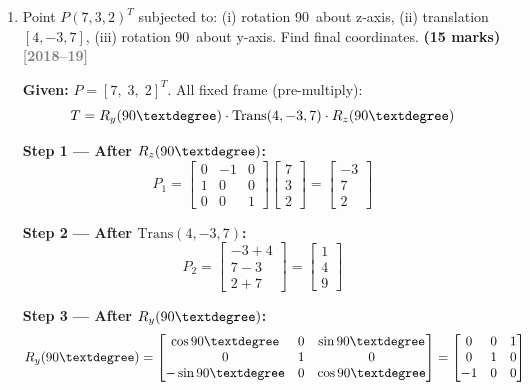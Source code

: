 \documentclass[12pt,a3paper]{article}
\newcommand{\yr}[1]{\hfill\textcolor{gray}{\small\textbf{[#1]}}}
\newcommand{\mk}[1]{\textcolor{orange!70!black}{\small\textbf{(#1 marks)}}}
\begin{document}
\begin{enumerate}
\item \label{qlabel:C4-Q5}
Point $P(7,3,2)^T$ subjected to: (i) rotation 90\textdegree\ about
z-axis, (ii) translation $[4,-3,7]$, (iii) rotation 90\textdegree\
about y-axis. Find final coordinates. \mk{15}
\yr{2018--19}

\begin{tcolorbox}[enhanced,breakable,ansbox,colback=cD!4,colframe=cD,
  boxrule=0.8pt,arc=5pt,
  title={\textbf{Answer}},fonttitle=\bfseries\color{white},colbacktitle=cD]

\textbf{Given:} $P = [7,\;3,\;2]^T$. All fixed frame (pre-multiply):
\[
  T = R_y(90\textdegree)\cdot\mathrm{Trans}(4,-3,7)\cdot R_z(90\textdegree)
\]

\textbf{Step 1 — After $R_z(90\textdegree)$:}
\[
  P_1 = \begin{bmatrix}0&-1&0\\1&0&0\\0&0&1\end{bmatrix}
  \begin{bmatrix}7\\3\\2\end{bmatrix}
  = \begin{bmatrix}-3\\7\\2\end{bmatrix}
\]

\textbf{Step 2 — After $\mathrm{Trans}(4,-3,7)$:}
\[
  P_2 = \begin{bmatrix}-3+4\\7-3\\2+7\end{bmatrix}
  = \begin{bmatrix}1\\4\\9\end{bmatrix}
\]

\textbf{Step 3 — After $R_y(90\textdegree)$:}
\[
  R_y(90\textdegree) =
  \begin{bmatrix}
    \cos90\textdegree & 0 & \sin90\textdegree\\
    0 & 1 & 0\\
    -\sin90\textdegree & 0 & \cos90\textdegree
  \end{bmatrix}
  =
  \begin{bmatrix}0&0&1\\0&1&0\\-1&0&0\end{bmatrix}
\]


\end{tcolorbox}
\end{enumerate}
\end{document}
